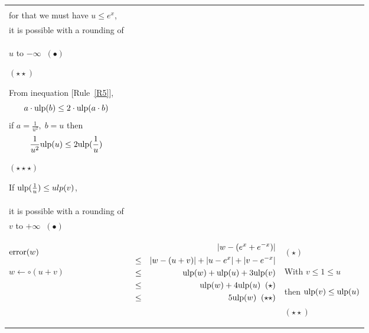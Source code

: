 \documentclass[12pt]{amsart}
\def\ulp{{\rm ulp}}
\newcommand{\U}[1]{\quad \mbox{[Rule~\ref{#1}]}}
\begin{document}
\begin{center}
\begin{tabular}{l l l}
\begin{minipage}{7.5cm}
\end{minipage} &
\begin{minipage}{6cm}

$(\star)$

With $\frac{1}{e^x} \leq \frac{1}{u}$,\\
for that we must have $u \leq e^x$,\\
it is possible with a rounding of\\
$u$ to $-\infty \;\; (\bullet)$

$(\star\star)$

From inequation \U{R5},
\[   a \cdot \ulp(b) \leq 2 \cdot \ulp(a \cdot b)\]
if $a =\frac{1}{u^2},\;b = u$ then
\[ \frac{1}{u^2} \ulp(u)  \leq 2 \ulp(\frac{1}{u})\]

$(\star\star\star)$

If $\ulp(\frac{1}{u}) \leq ulp(v)$,\\
it is possible with a rounding of \\
$v$ to $+\infty \;\; (\bullet)$\\



\end{minipage}\\%
\begin{minipage}{2.5cm}
${\textnormal{error}}(w)$


$w \leftarrow \circ(u+v) $
\end{minipage} &
\begin{minipage}{7.5cm}



\begin{eqnarray}\nonumber
  &&|w-(e^{x}+e^{-x})| \\\nonumber
  &       \leq&  |w - (u+v)|+|u - e^x|+|v - e^{-x}|\\\nonumber
  &       \leq& \ulp(w) + \ulp(u) + 3\ulp(v)\\\nonumber
  &       \leq& \ulp(w) + 4\ulp(u)\;\;(\star)\\\nonumber
  &       \leq& 5\ulp(w)\;\;(\star\star)\\\nonumber
\end{eqnarray}


\end{minipage} &
\begin{minipage}{6cm}

$(\star)$

With $v \leq 1\leq u$

then $\ulp(v) \leq \ulp(u)$

$(\star\star)$


\end{minipage}
\end{tabular}
\end{center}
\end{document}
